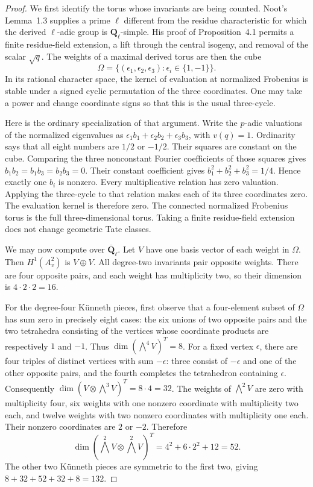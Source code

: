 \documentclass[11pt]{article}
\theoremstyle{definition}
\theoremstyle{remark}
\begin{document}
\begin{proof}
We first identify the torus whose invariants are being counted.
Noot's Lemma~1.3 supplies a prime $\ell$ different from the residue
characteristic for which the derived $\ell$-adic group is
$\mathbf Q_\ell$-simple.  His proof of Proposition~4.1
\cite[pp.~12--14]{NootMumfordGalois} permits a finite residue-field
extension, a lift through the central isogeny, and removal of the scalar
$\sqrt q$.  The weights of a maximal derived torus are then the cube
\[
 \Omega=\{(\epsilon_1,\epsilon_2,\epsilon_3):\epsilon_i\in\{1,-1\}\}.
\]
In its rational character space, the kernel of evaluation at normalized
Frobenius is stable under a signed cyclic permutation of the three
coordinates.  One may take a power and change coordinate signs so that
this is the usual three-cycle.

Here is the ordinary specialization of that argument.  Write the
$p$-adic valuations of the normalized eigenvalues as
$\epsilon_1b_1+\epsilon_2b_2+\epsilon_3b_3$, with $v(q)=1$.
Ordinarity says that all eight numbers are $1/2$ or $-1/2$.
Their squares are constant on the cube.  Comparing the three
nonconstant Fourier coefficients of those squares gives
$b_1b_2=b_1b_3=b_2b_3=0$.  Their constant coefficient gives
$b_1^2+b_2^2+b_3^2=1/4$.  Hence exactly one $b_i$ is nonzero.
Every multiplicative relation has zero valuation.  Applying the
three-cycle to that relation makes each of its three coordinates
zero.  The evaluation kernel is therefore zero.  The connected
normalized Frobenius torus is the full three-dimensional torus.
Taking a finite residue-field extension does not change geometric
Tate classes.

We may now compute over $\overline{\mathbf Q}_\ell$.
Let $V$ have one basis vector of each weight in $\Omega$.
Then $H^1(A_v^2)$ is $V\oplus V$.  All degree-two invariants pair
opposite weights.  There are four opposite pairs, and each weight
has multiplicity two, so their dimension is $4\cdot2\cdot2=16$.

For the degree-four K\"unneth pieces, first observe that a four-element
subset of $\Omega$ has sum zero in precisely eight cases: the six
unions of two opposite pairs and the two tetrahedra consisting of the
vertices whose coordinate products are respectively $1$ and $-1$.
Thus $\dim(\bigwedge^4V)^T=8$.
For a fixed vertex $\epsilon$, there are four triples of distinct
vertices with sum $-\epsilon$: three consist of $-\epsilon$ and one
of the other opposite pairs, and the fourth completes the tetrahedron
containing $\epsilon$.  Consequently
$\dim(V\otimes\bigwedge^3V)^T=8\cdot4=32$.
The weights of $\bigwedge^2V$ are zero with multiplicity four,
six weights with one nonzero coordinate with multiplicity two each,
and twelve weights with two nonzero coordinates with multiplicity one
each.  Their nonzero coordinates are $2$ or $-2$.  Therefore
\[
 \dim(\bigwedge^2V\otimes\bigwedge^2V)^T
 =4^2+6\cdot2^2+12=52.
\]
The other two K\"unneth pieces are symmetric to the first two, giving
$8+32+52+32+8=132$.


\end{proof}
\end{document}
